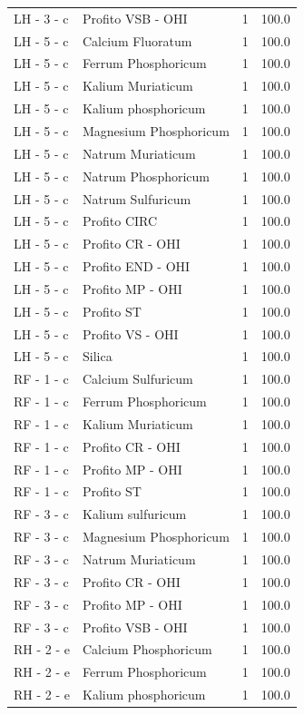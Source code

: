 \documentclass[a4paper,11pt]{article}
\begin{document}
\begin{footnotesize}
\begin{longtable}{p{3.5cm}p{7.5cm}rr}
LH - 3 - c & Profito VSB - OHI & 1 & 100.0 \\
LH - 5 - c & Calcium Fluoratum & 1 & 100.0 \\
LH - 5 - c & Ferrum Phosphoricum & 1 & 100.0 \\
LH - 5 - c & Kalium Muriaticum & 1 & 100.0 \\
LH - 5 - c & Kalium phosphoricum & 1 & 100.0 \\
LH - 5 - c & Magnesium Phosphoricum & 1 & 100.0 \\
LH - 5 - c & Natrum Muriaticum & 1 & 100.0 \\
LH - 5 - c & Natrum Phosphoricum & 1 & 100.0 \\
LH - 5 - c & Natrum Sulfuricum & 1 & 100.0 \\
LH - 5 - c & Profito CIRC & 1 & 100.0 \\
LH - 5 - c & Profito CR - OHI & 1 & 100.0 \\
LH - 5 - c & Profito END - OHI & 1 & 100.0 \\
LH - 5 - c & Profito MP - OHI & 1 & 100.0 \\
LH - 5 - c & Profito ST & 1 & 100.0 \\
LH - 5 - c & Profito VS - OHI & 1 & 100.0 \\
LH - 5 - c & Silica & 1 & 100.0 \\
RF - 1 - c & Calcium Sulfuricum & 1 & 100.0 \\
RF - 1 - c & Ferrum Phosphoricum & 1 & 100.0 \\
RF - 1 - c & Kalium Muriaticum & 1 & 100.0 \\
RF - 1 - c & Profito CR - OHI & 1 & 100.0 \\
RF - 1 - c & Profito MP - OHI & 1 & 100.0 \\
RF - 1 - c & Profito ST & 1 & 100.0 \\
RF - 3 - c & Kalium sulfuricum & 1 & 100.0 \\
RF - 3 - c & Magnesium Phosphoricum & 1 & 100.0 \\
RF - 3 - c & Natrum Muriaticum & 1 & 100.0 \\
RF - 3 - c & Profito CR - OHI & 1 & 100.0 \\
RF - 3 - c & Profito MP - OHI & 1 & 100.0 \\
RF - 3 - c & Profito VSB - OHI & 1 & 100.0 \\
RH - 2 - e & Calcium Phosphoricum & 1 & 100.0 \\
RH - 2 - e & Ferrum Phosphoricum & 1 & 100.0 \\
RH - 2 - e & Kalium phosphoricum & 1 & 100.0 \\

\end{longtable}
\end{footnotesize}
\end{document}
